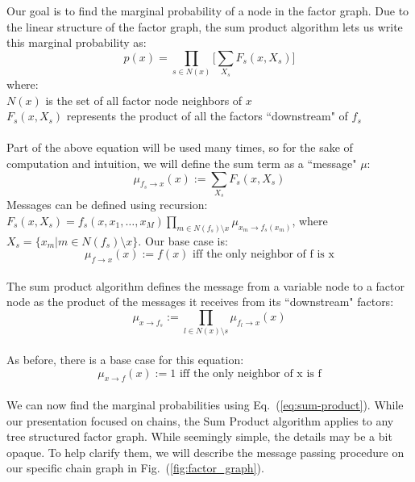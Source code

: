 \documentclass[11pt]{article}
\begin{document}
Our goal is to find the marginal probability of a node in the factor graph. Due to the linear structure of the factor graph, the sum product algorithm lets us write this marginal probability as:
\begin{equation}
\label{eq:sum-product}
	p(x) = \prod_{s \in N(x)} \Bigg[ \sum_{X_s} F_s(x, X_s) \Bigg]
\end{equation}
where:\\
\indent $N(x)$ is the set of all factor node neighbors of $x$\\
\indent $F_s(x, X_s)$ represents the product of all the factors ``downstream" of $f_s$\\
\\
Part of the above equation will be used many times, so for the sake of computation and intuition, we will define the sum term as a ``message" $\mu$:
\begin{equation}
\label{eq:f2x}
	\mu_{f_s \rightarrow x}(x) := \sum_{X_s} F_s(x, X_s)
\end{equation}
Messages can be defined using recursion: $F_s(x, X_s)=f_s(x,x_1,\ldots,x_M) \prod\limits_{m \in N(f_s) \setminus x} \mu_{x_m \rightarrow f_s(x_m)}$, where $X_s=\{x_m|m \in N(f_s) \setminus x\}$. Our base case is:
\begin{equation}
\label{eq:f2xbase}
	\mu_{f \rightarrow x}(x) := f(x) \text{ iff the only neighbor of f is x}
\end{equation}
\\
The sum product algorithm defines the message from a variable node to a factor node as the product of the messages it receives from its ``downstream" factors:
\begin{equation}
\label{eq:x2f}
	\mu_{x \rightarrow f_s} := \prod_{l \in N(x) \setminus s} \mu_{f_l \rightarrow x}(x)
\end{equation}
\\
As before, there is a base case for this equation:
\[
	\mu_{x \rightarrow f}(x) := 1 \text{ iff the only neighbor of x is f}
\]
\\
We can now find the marginal probabilities using Eq.~(\ref{eq:sum-product}). While our presentation focused on chains, the Sum Product algorithm applies to any tree structured factor graph. While seemingly simple, the details may be a bit opaque. To help clarify them, we will describe the message passing procedure on our specific chain graph in Fig.~(\ref{fig:factor_graph}).
\end{document}
